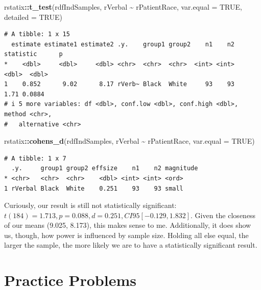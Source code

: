 \documentclass[
  11pt,
]{book}
\newenvironment{Shaded}{\begin{snugshade}}{\end{snugshade}}
\newcommand{\AttributeTok}[1]{\textcolor[rgb]{0.27,0.27,0.27}{#1}}
\newcommand{\ConstantTok}[1]{\textcolor[rgb]{0.37,0.37,0.37}{#1}}
\newcommand{\FunctionTok}[1]{\textcolor[rgb]{0.27,0.27,0.27}{\textbf{#1}}}
\newcommand{\NormalTok}[1]{#1}
\newcommand{\SpecialCharTok}[1]{\textcolor[rgb]{0.43,0.43,0.43}{\textbf{#1}}}
\begin{document}
\begin{Shaded}
\begin{Highlighting}[]
\NormalTok{rstatix}\SpecialCharTok{::}\FunctionTok{t\_test}\NormalTok{(rdfIndSamples, rVerbal }\SpecialCharTok{\textasciitilde{}}\NormalTok{ rPatientRace, }\AttributeTok{var.equal =} \ConstantTok{TRUE}\NormalTok{,}
    \AttributeTok{detailed =} \ConstantTok{TRUE}\NormalTok{)}
\end{Highlighting}
\end{Shaded}

\begin{verbatim}
# A tibble: 1 x 15
  estimate estimate1 estimate2 .y.    group1 group2    n1    n2 statistic      p
*    <dbl>     <dbl>     <dbl> <chr>  <chr>  <chr>  <int> <int>     <dbl>  <dbl>
1    0.852      9.02      8.17 rVerb~ Black  White     93    93      1.71 0.0884
# i 5 more variables: df <dbl>, conf.low <dbl>, conf.high <dbl>, method <chr>,
#   alternative <chr>
\end{verbatim}

\begin{Shaded}
\begin{Highlighting}[]
\NormalTok{rstatix}\SpecialCharTok{::}\FunctionTok{cohens\_d}\NormalTok{(rdfIndSamples, rVerbal }\SpecialCharTok{\textasciitilde{}}\NormalTok{ rPatientRace, }\AttributeTok{var.equal =} \ConstantTok{TRUE}\NormalTok{)}
\end{Highlighting}
\end{Shaded}

\begin{verbatim}
# A tibble: 1 x 7
  .y.     group1 group2 effsize    n1    n2 magnitude
* <chr>   <chr>  <chr>    <dbl> <int> <int> <ord>    
1 rVerbal Black  White    0.251    93    93 small    
\end{verbatim}

Curiously, our result is still not statistically significant: \(t(184) = 1.713, p = 0.088, d = 0.251, CI95[-0.129, 1.832]\). Given the closeness of our means (9.025, 8.173), this makes sense to me. Additionally, it does show us, though, how power is influenced by sample size. Holding all else equal, the larger the sample, the more likely we are to have a statistically significant result.

\hypertarget{practice-problems-3}{%
\section{Practice Problems}\label{practice-problems-3}}
\end{document}
